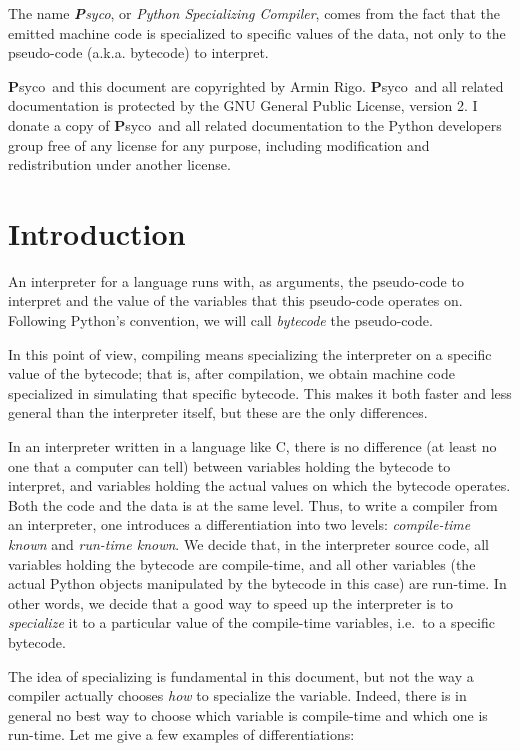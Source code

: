 \documentclass{article}
\def\Psyco{{\bf P}syco}
\begin{document}
The name \emph{\Psyco}, or \emph{Python Specializing Compiler}, comes from the fact that the emitted machine code is specialized to specific values of the data, not only to the pseudo-code (a.k.a. bytecode) to interpret.

\bigskip

\Psyco\ and this document are copyrighted by Armin Rigo. \Psyco\ and all related documentation is protected by the GNU General Public License, version 2. I donate a copy of \Psyco\ and all related documentation to the Python developers group free of any license for any purpose, including modification and redistribution under another license.



\section{Introduction}


An interpreter for a language runs with, as arguments, the pseudo-code to interpret and the value of the variables that this pseudo-code operates on. Following Python's convention, we will call \emph{bytecode} the pseudo-code.

In this point of view, compiling means specializing the interpreter on a specific value of the bytecode; that is, after compilation, we obtain machine code specialized in simulating that specific bytecode. This makes it both faster and less general than the interpreter itself, but these are the only differences.

In an interpreter written in a language like C, there is no difference (at least no one that a computer can tell) between variables holding the bytecode to interpret, and variables holding the actual values on which the bytecode operates. Both the code and the data is at the same level. Thus, to write a compiler from an interpreter, one introduces a differentiation into two levels: \emph{compile-time known} and \emph{run-time known}. We decide that, in the interpreter source code, all variables holding the bytecode are compile-time, and all other variables (the actual Python objects manipulated by the bytecode in this case) are run-time. In other words, we decide that a good way to speed up the interpreter is to \emph{specialize} it to a particular value of the compile-time variables, i.e.\ to a specific bytecode.

The idea of specializing is fundamental in this document, but not the way a compiler actually chooses \emph{how} to specialize the variable. Indeed, there is in general no best way to choose which variable is compile-time and which one is run-time. Let me give a few examples of differentiations:
\end{document}

